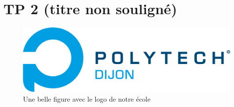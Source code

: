 

\section{TP 2 (titre non souligné)}

\begin{figure}[H]
    \centering
    \includegraphics[width=14cm]{Graphismes-POLYTECH/logos/logo-couleur.png}
    \caption{Une belle figure avec le logo de notre école}
\end{figure}